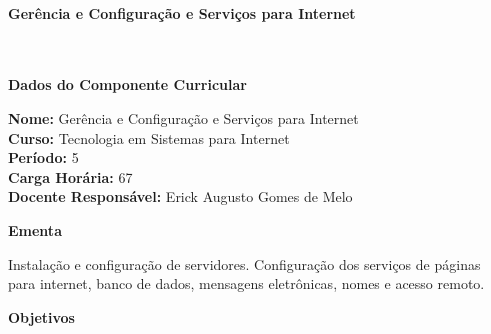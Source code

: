 \paragraph{Gerência e Configuração e Serviços para Internet} \


\begin{snugshade}\begin{center}\textbf{
    Dados do Componente Curricular
}\end{center}\end{snugshade}

\noindent \textbf{Nome:}                Gerência e Configuração e Serviços para Internet
\\        \textbf{Curso:}               Tecnologia em Sistemas para Internet
\\        \textbf{Período:}             \unit{5}{\degree}
\\        \textbf{Carga Horária:}       \unit{67}{\hour}
\\        \textbf{Docente Responsável:} Erick Augusto Gomes de Melo


\begin{snugshade}\begin{center}\textbf{
    Ementa
\vphantom{q}}\end{center}\end{snugshade}

\noindent
Instalação e configuração de servidores. Configuração dos serviços de páginas para internet, banco de dados, mensagens eletrônicas, nomes e acesso remoto.


\begin{snugshade}\begin{center}\textbf{
    Objetivos
}\end{center}\end{snugshade}

